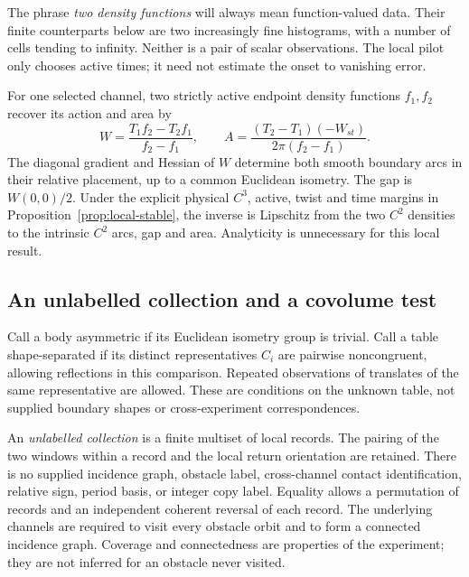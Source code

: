 The phrase \emph{two density functions} will always mean function-valued
data. Their finite counterparts below are two increasingly fine
histograms, with a number of cells tending to infinity. Neither is a
pair of scalar observations. The local pilot only chooses active times;
it need not estimate the onset to vanishing error.

\begin{theorem}\label{thm:local-main}
For one selected channel, two strictly active endpoint density functions
$f_1,f_2$ recover its action and area by
\begin{equation}\label{eq:ratio-main}
 W=\frac{T_1f_2-T_2f_1}{f_2-f_1},\qquad
 A=\frac{(T_2-T_1)(-W_{st})}{2\pi(f_2-f_1)}.
\end{equation}
The diagonal gradient and Hessian of $W$ determine both smooth boundary
arcs in their relative placement, up to a common Euclidean isometry.
The gap is $W(0,0)/2$. Under the explicit physical $C^3$, active,
twist and time margins in Proposition~\ref{prop:local-stable}, the
inverse is Lipschitz from the two $C^2$ densities to the intrinsic
$C^2$ arcs, gap and area. Analyticity is unnecessary for this local result.
\end{theorem}

\subsection{An unlabelled collection and a covolume test}
Call a body asymmetric if its Euclidean isometry group is trivial.
Call a table shape-separated if its distinct representatives $C_i$
are pairwise noncongruent, allowing reflections in this comparison.
Repeated observations of translates of the same representative are
allowed. These are conditions on the unknown table, not supplied
boundary shapes or cross-experiment correspondences.

An \emph{unlabelled collection} is a finite multiset of local records.
The pairing of the two windows within a record and the local return
orientation are retained. There is no supplied incidence graph, obstacle
label, cross-channel contact identification, relative sign, period basis,
or integer copy label. Equality allows a permutation of records and an
independent coherent reversal of each record. The underlying channels
are required to visit every obstacle orbit and to form a connected
incidence graph. Coverage and connectedness are properties of the
experiment; they are not inferred for an obstacle never visited.

